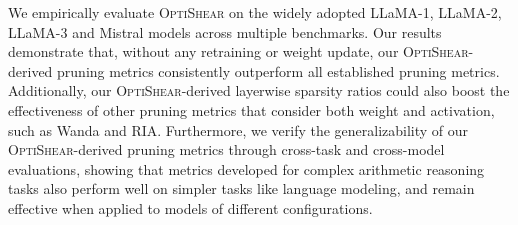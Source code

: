 We empirically evaluate \textsc{OptiShear} on the widely adopted LLaMA-1, LLaMA-2, LLaMA-3 and Mistral models across multiple benchmarks. Our results demonstrate that, without any retraining or weight update, our \textsc{OptiShear}-derived pruning metrics consistently outperform all established pruning metrics. 
Additionally, our \textsc{OptiShear}-derived layerwise sparsity ratios could also boost the effectiveness of other pruning metrics that consider both weight and activation, such as Wanda and RIA.
Furthermore, we verify the generalizability of our \textsc{OptiShear}-derived pruning metrics through cross-task and cross-model evaluations, showing that metrics developed for complex arithmetic reasoning tasks also perform well on simpler tasks like language modeling, and remain effective when applied to models of different configurations.

